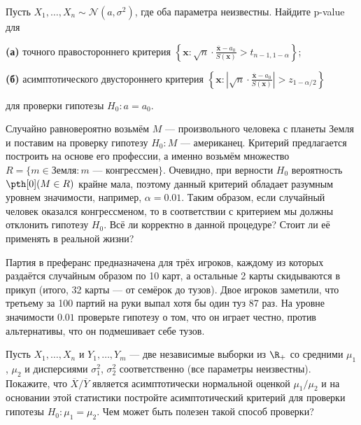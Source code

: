 \begin{problem}
	Пусть $X_1, \ldots, X_n \sim \mathcal{N}(a, \sigma^2)$, где оба параметра неизвестны. Найдите p-value для
	
	\textbf{(а)} точного правостороннего критерия $\left\{\mathbf x\colon \sqrt{n} \cdot \frac{\overline{\mathbf x} - a_0}{S(\mathbf x)} > t_{n-1,1-\alpha}\right\}$;

	\textbf{(б)} асимптотического двустороннего критерия $\left\{\mathbf x\colon \left|\sqrt{n} \cdot \frac{\overline{\mathbf x} - a_0}{S(\mathbf x)}\right| > z_{1-\alpha/2}\right\}$

\noindent
для проверки гипотезы $H_0\colon a = a_0$.
\end{problem}

\begin{problem}
	Случайно равновероятно возьмём $M$ --- произвольного человека с планеты Земля и поставим на проверку гипотезу $H_0\colon \text{$M$ --- американец}$. Критерий предлагается построить на основе его профессии, а именно возьмём множество $R = \{m \in \text{Земля}\colon \text{$m$ --- конгрессмен}\}$. Очевидно, при верности $H_0$ вероятность $\pth[0](M \in R)$ крайне мала, поэтому данный критерий обладает разумным уровнем значимости, например, $\alpha = 0.01$. Таким образом, если случайный человек оказался конгрессменом, то в соответствии с критерием мы должны отклонить гипотезу $H_0$. Всё ли корректно в данной процедуре? Стоит ли её применять в реальной жизни?
\end{problem}

\begin{problem}
	Партия в преферанс предназначена для трёх игроков, каждому из которых раздаётся случайным образом по 10 карт, а остальные 2 карты скидываются в прикуп (итого, 32 карты --- от семёрок до тузов). Двое игроков заметили, что третьему за 100 партий на руки выпал хотя бы один туз 87 раз. На уровне значимости $0.01$ проверьте гипотезу о том, что он играет честно, против альтернативы, что он подмешивает себе тузов.
\end{problem}

\begin{problem}
	Пусть $X_1, \ldots, X_n$ и $Y_1, \ldots, Y_m$ --- две независимые выборки из $\R_+$ со средними $\mu_1$, $\mu_2$ и дисперсиями $\sigma_1^2$, $\sigma^2_2$ соответственно (все параметры неизвестны). Покажите, что $\overline{X} / \overline{Y}$ является асимптотически нормальной оценкой $\mu_1 / \mu_2$ и на основании этой статистики постройте асимптотический критерий для проверки гипотезы $H_0\colon \mu_1 = \mu_2$. Чем может быть полезен такой способ проверки?
\end{problem}

